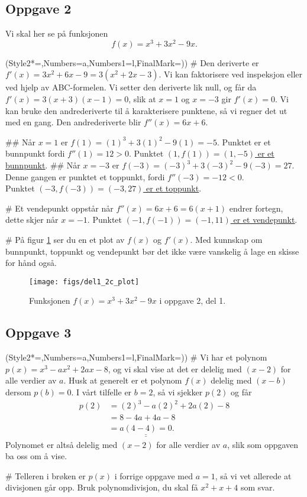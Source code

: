 \documentclass[12pt, a4paper]
{article}						%
\def\answer#1{\underline{\underline{#1}}}
\begin{document}
\subsection*{Oppgave 2}
Vi skal her se på funksjonen 
\begin{equation*}
	f(x) = x^3 + 3x^2 - 9x.
\end{equation*}
\begin{easylist}[enumerate]
	\ListProperties(Style2*=,Numbers=a,Numbers1=l,FinalMark={)})
	# Den deriverte er $f'(x) = 3x^2 + 6x - 9 = 3(x^2 + 2x - 3)$.
	Vi kan faktorisere ved inspeksjon eller ved hjelp av ABC-formelen.
	Vi setter den deriverte lik null, og får da $f'(x) = 3(x+3)(x-1) = 0$, 
	slik at $x = 1$ og $x = -3$ gir $f'(x) = 0$.
	Vi kan bruke den andrederiverte til å karakterisere punktene,
	så vi regner det ut med en gang. Den andrederiverte blir $f''(x) = 6x+6$.
	
	## Når $x =1$ er $f(1) = (1)^3 + 3(1)^2 - 9(1) = -5$.
	Punktet er et bunnpunkt fordi $f''(1) = 12 > 0$.
	Punktet \answer{$(1, f(1)) = (1, -5)$ er et bunnpunkt}.
	## Når $x =-3$ er $f(-3) = (-3)^3 + 3(-3)^2 - 9(-3) = 27$.
	Denne gangen er punktet et toppunkt, fordi $f''(-3) = -12 < 0$. \\
	Punktet \answer{$(-3, f(-3)) = (-3, 27)$ er et toppunkt}.
	
	# Et vendepunkt oppstår når $f''(x) = 6x+6 = 6(x+1)$ endrer fortegn,
	dette skjer når $x = -1$. Punktet \answer{$(-1, f(-1)) = (-1, 11)$ er et vendepunkt}.
	
	# På figur \ref{fig:del12cplot} ser du en et plot av $f(x)$ og $f'(x)$.
	Med kunnskap om bunnpunkt, toppunkt og vendepunkt bør det ikke være vanskelig å lage en skisse for hånd også.
	\begin{figure}[th!]
		\centering
		\texttt{[image: figs/del1\_2c\_plot]}
		\caption{Funksjonen $f(x) = x^3 + 3x^2 - 9x$ i oppgave 2, del 1.}
		\label{fig:del12cplot}
	\end{figure}
\end{easylist}

\subsection*{Oppgave 3}
\begin{easylist}[enumerate]
	\ListProperties(Style2*=,Numbers=a,Numbers1=l,FinalMark={)})
	# Vi har et polynom $p(x) = x^3 - ax^2 + 2ax - 8$, og vi skal vise at det er delelig
	med $(x-2)$ for alle verdier av $a$. Husk at generelt er et polynom $f(x)$ delelig med $(x-b)$ dersom $p(b) = 0$. I vårt tilfelle er $b = 2$, så vi sjekker $p(2)$ og får
	\begin{align*}
		p(2) &= (2)^3 - a(2)^2 + 2a(2) - 8 \\
		&= 8 - 4a + 4a - 8 \\
		&= \answer{a(4-4) = 0}.
	\end{align*}
	Polynomet er altså delelig med $(x-2)$ for alle verdier av $a$, slik som oppgaven ba oss om å vise.
	
	# Telleren i brøken er $p(x)$ i forrige oppgave med $a = 1$, så vi vet allerede at divisjonen går opp.
	Bruk polynomdivisjon, du skal få \answer{$x^2 + x + 4$} som svar. 
\end{easylist}
\end{document}
